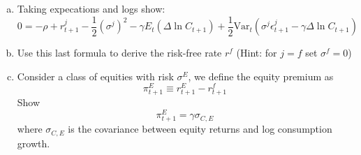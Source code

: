 \documentclass[11pt]{extarticle}
\theoremstyle{plain}
\theoremstyle{definition}
\begin{document}
\begin{enumerate}[(a)]
\item Taking expecations and logs show:
\begin{equation}
	0 =  - \rho + r_{t+1}^j - \frac{1}{2} (\sigma^j)^2 - \gamma E_t(\Delta \ln C_{t+1}) + \frac{1}{2} \text{Var}_t( \sigma^j \epsilon_{t+1}^j - \gamma \Delta \ln C_{t+1})
\end{equation}


\item Use this last formula to derive the risk-free rate $r^f$ (Hint: for $j=f$ set $\sigma^f=0$)


\item Consider a class of equities with risk $\sigma^E$, we define the equity premium as $$\pi_{t+1}^E \equiv r_{t+1}^E - r_{t+1}^f $$
Show $$\pi_{t+1}^E = \gamma \sigma_{C,E}$$ where $\sigma_{C,E}$ is the covariance between equity returns and log consumption growth. 

\end{enumerate}
\end{document}
